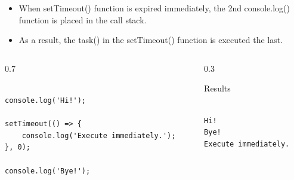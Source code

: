 \begin{frame}[fragile]{}

\begin{itemize}
\item When setTimeout() function is expired immediately, the 2nd console.log() function is placed in the call stack.
\item As a result, the task() in the setTimeout() function is executed the last. 
\end{itemize}

\begin{columns}%
\begin{column}{0.7\textwidth}%
\begin{center}%
\begin{Code}{}%
\begin{lstlisting}[firstnumber=1, label=glabels, xleftmargin=0pt, basicstyle=\scriptsize]%  

console.log('Hi!');

setTimeout(() => {
    console.log('Execute immediately.');
}, 0);

console.log('Bye!');
\end{lstlisting}%
\end{Code}%
\end{center}%
\end{column}%
\begin{column}{0.3\textwidth}%
\begin{Command}{Results}%
\begin{lstlisting}[firstnumber=1, label=glabels, xleftmargin=0pt, basicstyle=\tiny]% 

Hi!
Bye!
Execute immediately.
\end{lstlisting}%
\end{Command}%
\end{column}%
\end{columns}%

\end{frame}